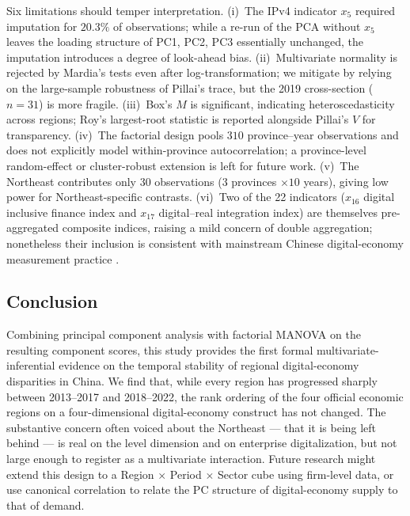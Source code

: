 \documentclass[12pt,letterpaper]{article}
\begin{document}
Six limitations should temper interpretation.  (i)~The IPv4 indicator $x_5$
required imputation for $20.3\%$ of observations; while a re-run of the PCA
without $x_5$ leaves the loading structure of PC1, PC2, PC3 essentially
unchanged, the imputation introduces a degree of look-ahead bias.
(ii)~Multivariate normality is rejected by Mardia's tests even after
log-transformation; we mitigate by relying on the large-sample robustness of
Pillai's trace, but the 2019 cross-section ($n=31$) is more fragile.
(iii)~Box's $M$ is significant, indicating heteroscedasticity across regions;
Roy's largest-root statistic is reported alongside Pillai's $V$ for
transparency.  (iv)~The factorial design pools $310$ province--year observations
and does not explicitly model within-province autocorrelation; a province-level
random-effect or cluster-robust extension is left for future work.
(v)~The Northeast contributes only $30$ observations ($3$ provinces $\times 10$
years), giving low power for Northeast-specific contrasts.
(vi)~Two of the 22 indicators ($x_{16}$ digital inclusive finance index and
$x_{17}$ digital--real integration index) are themselves pre-aggregated
composite indices, raising a mild concern of double aggregation; nonetheless
their inclusion is consistent with mainstream Chinese digital-economy
measurement practice \citep{he2023,he2024}.

\subsection{Conclusion}

Combining principal component analysis with factorial MANOVA on the resulting
component scores, this study provides the first formal multivariate-inferential
evidence on the temporal stability of regional digital-economy disparities in
China.  We find that, while every region has progressed sharply between
2013--2017 and 2018--2022, the rank ordering of the four official economic
regions on a four-dimensional digital-economy construct has not changed.  The
substantive concern often voiced about the Northeast --- that it is being left
behind --- is real on the level dimension and on enterprise digitalization, but
not large enough to register as a multivariate interaction.  Future research
might extend this design to a Region $\times$ Period $\times$ Sector cube using
firm-level data, or use canonical correlation to relate the PC structure of
digital-economy supply to that of demand.

\newpage
{}
\end{document}
